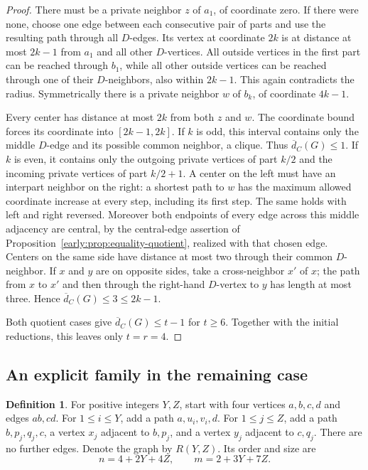 \documentclass[11pt,a4paper]{article}
\theoremstyle{definition}\newtheorem{definition}[theorem]{Definition}
\theoremstyle{remark}\newtheorem{remark}[theorem]{Remark}
\begin{document}
\begin{proof}
There must be a private neighbor $z$ of $a_1$, of coordinate zero.
If there were none, choose one edge between each consecutive pair
of parts and use the resulting path through all $D$-edges.  Its
vertex at coordinate $2k$ is at distance at most $2k-1$ from $a_1$
and all other $D$-vertices.  All outside vertices in the first part
can be reached through $b_1$, while all other outside vertices can
be reached through one of their $D$-neighbors, also within $2k-1$.
This again contradicts the radius.  Symmetrically there is a private
neighbor $w$ of $b_k$, of coordinate $4k-1$.

Every center has distance at most $2k$ from both $z$ and $w$.
The coordinate bound forces its coordinate into $[2k-1,2k]$.
If $k$ is odd, this interval contains only the middle $D$-edge and
its possible common neighbor, a clique.  Thus
$\overline d_C(G)\leq1$.  If $k$ is even, it contains only the
outgoing private vertices of part $k/2$ and the incoming private
vertices of part $k/2+1$.  A center on the left must have an
interpart neighbor on the right: a shortest path to $w$ has the
maximum allowed coordinate increase at every step, including its
first step.  The same holds with left and right reversed.  Moreover
both endpoints of every edge across this middle adjacency are
central, by the central-edge assertion of
Proposition~\ref{early:prop:equality-quotient}, realized with that
chosen edge.  Centers on the same side have distance at most two
through their common $D$-neighbor.  If $x$ and $y$ are on opposite
sides, take a cross-neighbor $x'$ of $x$; the path from $x$ to $x'$
and then through the right-hand $D$-vertex to $y$ has length at
most three.  Hence $\overline d_C(G)\leq3\leq2k-1$.

Both quotient cases give $\overline d_C(G)\leq t-1$ for $t\geq6$.
Together with the initial reductions, this leaves only $t=r=4$.
\end{proof}

\subsection{An explicit family in the remaining case}

\begin{definition}
\label{early:def:269-family}
For positive integers $Y,Z$, start with four vertices $a,b,c,d$ and
edges $ab,cd$.  For $1\leq i\leq Y$, add a path
$a,u_i,v_i,d$.  For $1\leq j\leq Z$, add a path
$b,p_j,q_j,c$, a vertex $x_j$ adjacent to $b,p_j$, and a vertex
$y_j$ adjacent to $c,q_j$.  There are no further edges.  Denote the
graph by $R(Y,Z)$.  Its order and size are
\[
 n=4+2Y+4Z,\qquad m=2+3Y+7Z.
\]
\end{definition}
\end{document}
